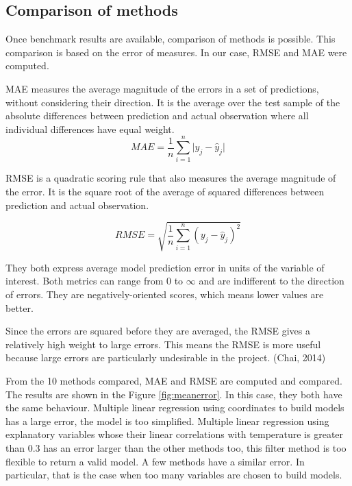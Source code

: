 \documentclass[12pt,twoside]{reedthesis}
\theoremstyle{definition}
\theoremstyle{definition}
\theoremstyle{definition}
\theoremstyle{remark}
\begin{document}
\subsection{Comparison of methods}\label{comparison-of-methods}

Once benchmark results are available, comparison of methods is possible.
This comparison is based on the error of measures. In our case, RMSE and
MAE were computed.

MAE measures the average magnitude of the errors in a set of
predictions, without considering their direction. It is the average over
the test sample of the absolute differences between prediction and
actual observation where all individual differences have equal weight.
\[
MAE = \frac{1}{n} \sum_{i=1}^{n}{ \lvert y_{j} - \widehat{y}_{j} \rvert}
\]

RMSE is a quadratic scoring rule that also measures the average
magnitude of the error. It is the square root of the average of squared
differences between prediction and actual observation.

\[
RMSE = \sqrt{\frac{1}{n} \sum_{i=1}^{n}{( y_{j} - \widehat{y}_{j} )^2}}
\]

They both express average model prediction error in units of the
variable of interest. Both metrics can range from 0 to \(\infty\) and
are indifferent to the direction of errors. They are negatively-oriented
scores, which means lower values are better.

Since the errors are squared before they are averaged, the RMSE gives a
relatively high weight to large errors. This means the RMSE is more
useful because large errors are particularly undesirable in the project.
(Chai, 2014)

From the 10 methods compared, MAE and RMSE are computed and compared.
The results are shown in the Figure \ref{fig:meanerror}. In this case,
they both have the same behaviour. Multiple linear regression using
coordinates to build models has a large error, the model is too
simplified. Multiple linear regression using explanatory variables whose
their linear correlations with temperature is greater than 0.3 has an
error larger than the other methods too, this filter method is too
flexible to return a valid model. A few methods have a similar error. In
particular, that is the case when too many variables are chosen to build
models.
\end{document}
